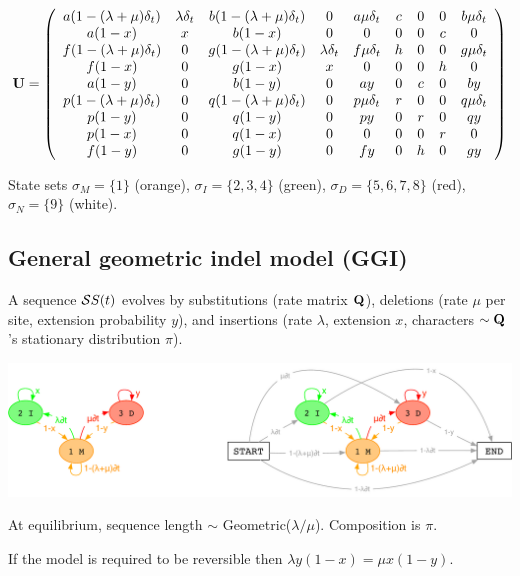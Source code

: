 \documentclass{article}
\begin{document}
\[
 {\bf U} =
  \left( \begin{array}{ccccccccc}
a (1-(\lambda+\mu) \delta_t) & \lambda \delta_t & b (1-(\lambda+\mu) \delta_t) & 0 & a \mu \delta_t & c & 0 & 0 & b \mu \delta_t \\
a (1-x) & x & b (1-x) & 0 & 0 & 0 & 0 & c & 0 \\
f (1-(\lambda+\mu) \delta_t) & 0 & g (1-(\lambda+\mu) \delta_t) & \lambda \delta_t & f \mu \delta_t & h & 0 & 0 & g \mu \delta_t \\
f (1-x) & 0 & g (1-x) & x & 0 & 0 & 0 & h & 0 \\
a (1-y) & 0 & b (1-y) & 0 & a y & 0 & c & 0 & b y \\
p (1-(\lambda+\mu) \delta_t) & 0 & q (1-(\lambda+\mu) \delta_t) & 0 & p \mu \delta_t & r & 0 & 0 & q \mu \delta_t \\
p (1-y) & 0 & q (1-y) & 0 & p y & 0 & r & 0 & q y \\
p (1-x) & 0 & q (1-x) & 0 & 0 & 0 & 0 & r & 0 \\
f (1-y) & 0 & g (1-y) & 0 & f y & 0 & h & 0 & g y    
  \end{array} \right)
\]

State sets
$\sigma_M=\{1\}$ (orange),
$\sigma_I=\{2,3,4\}$ (green),
$\sigma_D=\{5,6,7,8\}$ (red),
$\sigma_N=\{9\}$ (white).
  
\subsection{General geometric indel model (GGI)}

A sequence ${\cal S}S(t)$ evolves by
substitutions (rate matrix ${\bf Q}$),
deletions (rate $\mu$ per site, extension probability $y$),
and
insertions (rate $\lambda$, extension $x$,
characters $\sim {\bf Q}$'s stationary distribution $\pi$).

\includegraphics[width=\textwidth]{InstantHMM.pdf}

At equilibrium, sequence length $\sim$ Geometric($\lambda/\mu$). Composition is $\pi$.

If the model is required to be reversible then $\lambda y(1-x) = \mu x(1-y)$.
\end{document}
